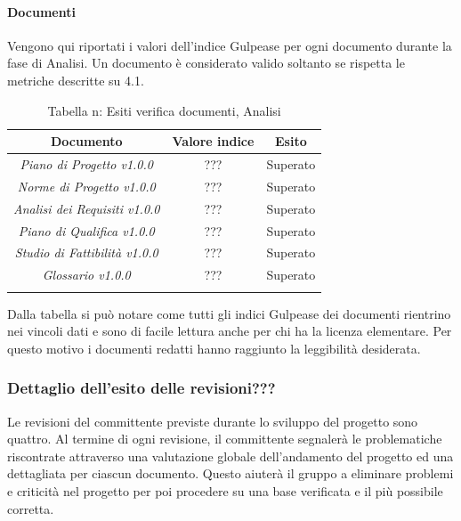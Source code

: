 \paragraph{Documenti}
Vengono qui riportati i valori dell’indice Gulpease per ogni documento durante la fase
di Analisi. Un documento è considerato valido soltanto se rispetta le metriche descritte
su 4.1.
\begin{longtable}{|c|c|c|}
\hline
\textbf{Documento} & \textbf{Valore indice} & \textbf{Esito} \\
\hline
	\emph{Piano di Progetto v1.0.0} & {???} & {Superato}\\
\hline
	\emph{Norme di Progetto v1.0.0} & {???} & {Superato}\\
\hline
	\emph{Analisi dei Requisiti v1.0.0} & {???} & {Superato}\\
\hline
	\emph{Piano di Qualifica v1.0.0} & {???} & {Superato}\\
\hline
	\emph{Studio di Fattibilità v1.0.0} & {???} & {Superato}\\
\hline
	\emph{Glossario v1.0.0} & {???} & {Superato}\\
\hline
\caption[Tabella n: Esiti verifica documenti, Analisi]{Tabella n: Esiti verifica documenti, Analisi}
\label{tabella:verifica documenti}
\endhead
\end{longtable}
Dalla tabella si può notare come tutti gli indici Gulpease dei documenti rientrino nei vincoli dati e sono di facile lettura anche per chi ha la licenza elementare. Per questo motivo i documenti redatti hanno raggiunto la leggibilità desiderata.
\subsubsection{Dettaglio dell’esito delle revisioni???}
Le revisioni del committente previste durante lo sviluppo del progetto sono quattro.
Al termine di ogni revisione, il committente segnalerà le problematiche riscontrate attraverso una valutazione globale dell'andamento del progetto ed una dettagliata per ciascun documento. 
Questo aiuterà il gruppo a eliminare problemi e criticità nel progetto per poi procedere su una base verificata e il più possibile corretta.
\pagebreak